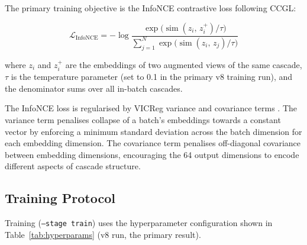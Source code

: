 \documentclass[12pt, a4paper]{article}
\begin{document}
The primary training objective is the InfoNCE contrastive loss \citep{he2020moco, chen2020simclr} following CCGL:

\begin{equation}
\mathcal{L}_{\text{InfoNCE}} = -\log \frac{\exp\!\big(\operatorname{sim}(z_i,\, z_i^+) / \tau\big)}{\displaystyle\sum_{j=1}^{N} \exp\!\big(\operatorname{sim}(z_i,\, z_j) / \tau\big)}
\end{equation}

where $z_i$ and $z_i^+$ are the embeddings of two augmented views of the same cascade, $\tau$ is the temperature parameter (set to 0.1 in the primary v8 training run), and the denominator sums over all in-batch cascades.

The InfoNCE loss is regularised by VICReg variance and covariance terms \citep{bardes2022vicreg}. The variance term penalises collapse of a batch's embeddings towards a constant vector by enforcing a minimum standard deviation across the batch dimension for each embedding dimension. The covariance term penalises off-diagonal covariance between embedding dimensions, encouraging the 64 output dimensions to encode different aspects of cascade structure.

\subsection{Training Protocol}

Training (\texttt{--stage train}) uses the hyperparameter configuration shown in Table~\ref{tab:hyperparams} (v8 run, the primary result).
\end{document}
